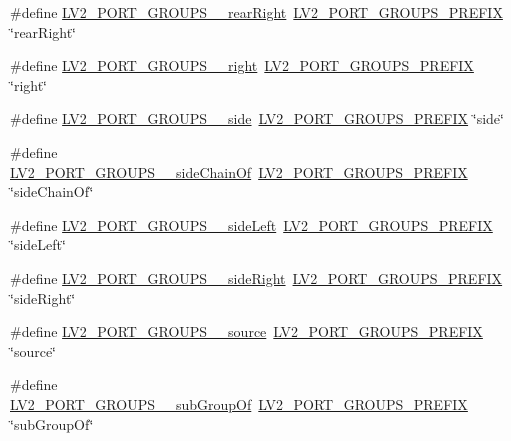 \begin{DoxyCompactItemize}
\item 
\#define \hyperlink{port-groups_8h_a52ff6e0b727d74f77be9c01f80c60622}{L\+V2\+\_\+\+P\+O\+R\+T\+\_\+\+G\+R\+O\+U\+P\+S\+\_\+\+\_\+rear\+Right}~\hyperlink{port-groups_8h_ad8eff71f3c96d9bf45282fed8195fde3}{L\+V2\+\_\+\+P\+O\+R\+T\+\_\+\+G\+R\+O\+U\+P\+S\+\_\+\+P\+R\+E\+F\+IX} \char`\"{}rear\+Right\char`\"{}
\item 
\#define \hyperlink{port-groups_8h_a888bccf9667e819b409642ddc21a1d3a}{L\+V2\+\_\+\+P\+O\+R\+T\+\_\+\+G\+R\+O\+U\+P\+S\+\_\+\+\_\+right}~\hyperlink{port-groups_8h_ad8eff71f3c96d9bf45282fed8195fde3}{L\+V2\+\_\+\+P\+O\+R\+T\+\_\+\+G\+R\+O\+U\+P\+S\+\_\+\+P\+R\+E\+F\+IX} \char`\"{}right\char`\"{}
\item 
\#define \hyperlink{port-groups_8h_ad9a22d64f44a35b9d26f348b1b050478}{L\+V2\+\_\+\+P\+O\+R\+T\+\_\+\+G\+R\+O\+U\+P\+S\+\_\+\+\_\+side}~\hyperlink{port-groups_8h_ad8eff71f3c96d9bf45282fed8195fde3}{L\+V2\+\_\+\+P\+O\+R\+T\+\_\+\+G\+R\+O\+U\+P\+S\+\_\+\+P\+R\+E\+F\+IX} \char`\"{}side\char`\"{}
\item 
\#define \hyperlink{port-groups_8h_a2f34caa5ab7e491a78a228c5a8c4e4d4}{L\+V2\+\_\+\+P\+O\+R\+T\+\_\+\+G\+R\+O\+U\+P\+S\+\_\+\+\_\+side\+Chain\+Of}~\hyperlink{port-groups_8h_ad8eff71f3c96d9bf45282fed8195fde3}{L\+V2\+\_\+\+P\+O\+R\+T\+\_\+\+G\+R\+O\+U\+P\+S\+\_\+\+P\+R\+E\+F\+IX} \char`\"{}side\+Chain\+Of\char`\"{}
\item 
\#define \hyperlink{port-groups_8h_aa3e920771e64b79d71d0188b69314a60}{L\+V2\+\_\+\+P\+O\+R\+T\+\_\+\+G\+R\+O\+U\+P\+S\+\_\+\+\_\+side\+Left}~\hyperlink{port-groups_8h_ad8eff71f3c96d9bf45282fed8195fde3}{L\+V2\+\_\+\+P\+O\+R\+T\+\_\+\+G\+R\+O\+U\+P\+S\+\_\+\+P\+R\+E\+F\+IX} \char`\"{}side\+Left\char`\"{}
\item 
\#define \hyperlink{port-groups_8h_ab8d89de3d5a0313fec3f860c565e2dd4}{L\+V2\+\_\+\+P\+O\+R\+T\+\_\+\+G\+R\+O\+U\+P\+S\+\_\+\+\_\+side\+Right}~\hyperlink{port-groups_8h_ad8eff71f3c96d9bf45282fed8195fde3}{L\+V2\+\_\+\+P\+O\+R\+T\+\_\+\+G\+R\+O\+U\+P\+S\+\_\+\+P\+R\+E\+F\+IX} \char`\"{}side\+Right\char`\"{}
\item 
\#define \hyperlink{port-groups_8h_ae51bae936ac6440af98ee8e3a2048290}{L\+V2\+\_\+\+P\+O\+R\+T\+\_\+\+G\+R\+O\+U\+P\+S\+\_\+\+\_\+source}~\hyperlink{port-groups_8h_ad8eff71f3c96d9bf45282fed8195fde3}{L\+V2\+\_\+\+P\+O\+R\+T\+\_\+\+G\+R\+O\+U\+P\+S\+\_\+\+P\+R\+E\+F\+IX} \char`\"{}source\char`\"{}
\item 
\#define \hyperlink{port-groups_8h_a26454450a1f37fdc56391be6a1f03260}{L\+V2\+\_\+\+P\+O\+R\+T\+\_\+\+G\+R\+O\+U\+P\+S\+\_\+\+\_\+sub\+Group\+Of}~\hyperlink{port-groups_8h_ad8eff71f3c96d9bf45282fed8195fde3}{L\+V2\+\_\+\+P\+O\+R\+T\+\_\+\+G\+R\+O\+U\+P\+S\+\_\+\+P\+R\+E\+F\+IX} \char`\"{}sub\+Group\+Of\char`\"{}
\end{DoxyCompactItemize}


